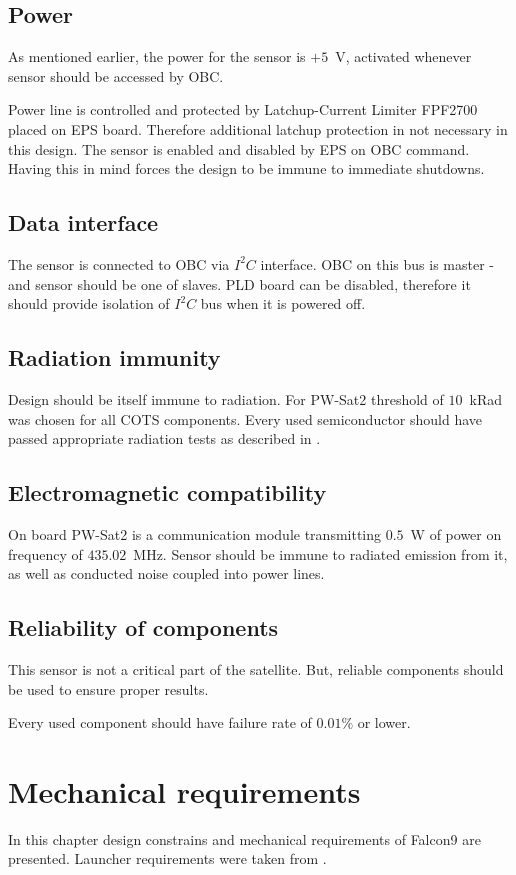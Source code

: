 \subsection{Power}
	As mentioned earlier, the power for the sensor is $+5$~V, activated whenever sensor should be accessed by OBC. 
	
	Power line is controlled and protected by Latchup-Current Limiter FPF2700 placed on EPS board. Therefore additional latchup protection in not necessary in this design. The sensor is enabled and disabled by EPS on OBC command. Having this in mind forces the design to be immune to immediate shutdowns. 
	
\subsection{Data interface}
	The sensor is connected to OBC via $I^2C$ interface. OBC on this bus is master - and sensor should be one of slaves. PLD board can be disabled, therefore it should provide isolation of $I^2C$ bus when it is powered off.
	
\subsection{Radiation immunity}
	Design should be itself immune to radiation. For PW-Sat2 threshold of $10$~kRad was chosen for all COTS components. Every used semiconductor should have passed appropriate radiation tests as described in \cite{ESCIES_TID_test_method}.

\subsection{Electromagnetic compatibility}
	On board PW-Sat2 is a communication module transmitting $0.5$~W of power on frequency of $435.02$~MHz. Sensor should be immune to radiated emission from it, as well as conducted noise coupled into power lines.

\subsection{Reliability of components}
	This sensor is not a critical part of the satellite. But, reliable components should be used to ensure proper results. 
	
	Every used component should have failure rate of $0.01\%$ or lower.


\section{Mechanical requirements}
	In this chapter design constrains and mechanical requirements of Falcon9 are presented. Launcher requirements were taken from \cite{Falcon9_user_manual}.
	
